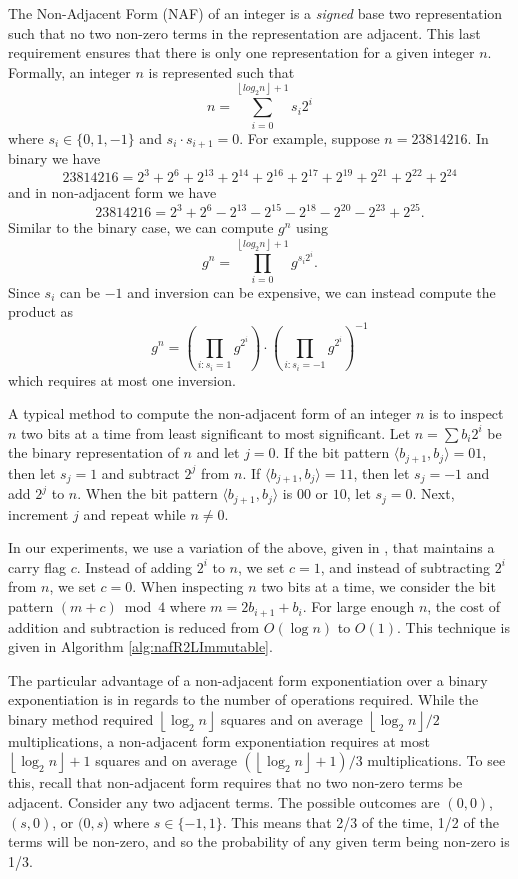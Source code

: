 \documentclass{ucalgthes1}
\theoremstyle{plain}
\theoremstyle{definition}
\newcommand{\floor}[1]{\left\lfloor #1 \right\rfloor}
\begin{document}
The Non-Adjacent Form (NAF) of an integer is a \emph{signed} base two representation such that no two non-zero terms in the representation are adjacent. This last requirement ensures that there is only one representation for a given integer $n$. Formally, an integer $n$ is represented such that
\[
	n = \sum_{i=0}^{\floor{log_2 n}+1} s_i 2^i
\]
where $s_i \in \{0, 1, -1\}$ and $s_i \cdot s_{i+1} = 0$. For example, suppose $n = 23814216$.  In binary we have
\begin{equation}\label{eq:binaryEg}
	23814216 = 2^3+2^6+2^{13}+2^{14}+2^{16}+2^{17}+2^{19}+2^{21}+2^{22}+2^{24}
\end{equation}
and in non-adjacent form we have
\begin{equation}\label{eq:nafEg}
	23814216 = 2^3+2^6-2^{13}-2^{15}-2^{18}-2^{20}-2^{23}+2^{25}.
\end{equation}
Similar to the binary case, we can compute $g^n$ using
\[
	g^n = \prod _{i=0}^{\floor{log_2 n}+1} g^{s_i 2^i}.
\]
Since $s_i$ can be $-1$ and inversion can be expensive, we can instead compute the product as
\[
	g^n = \left( \prod_{i : s_i=1} g^{2^i} \right) \cdot \left( \prod_{i : s_i=-1} g^{2^i} \right)^{-1}
\]
which requires at most one inversion.

A typical method to compute the non-adjacent form of an integer $n$ is to inspect $n$ two bits at a time from least significant to most significant.  Let $n=\sum b_i2^i$ be the binary representation of $n$ and let $j=0$.  If the bit pattern $\langle b_{j+1}, b_j \rangle = 01$, then let $s_j = 1$ and subtract $2^j$ from $n$.  If $\langle b_{j+1}, b_j \rangle = 11$, then let $s_j = -1$ and add $2^j$ to $n$.  When the bit pattern $\langle b_{j+1}, b_j \rangle$ is $00$ or $10$, let $s_j = 0$. Next, increment $j$ and repeat while $n \ne 0$.

In our experiments, we use a variation of the above, given in \cite[p.4]{Joye2000}, that maintains a carry flag $c$.  Instead of adding $2^i$ to $n$, we set $c = 1$, and instead of subtracting $2^i$ from $n$, we set $c = 0$.  When inspecting $n$ two bits at a time, we consider the bit pattern $(m+c) \bmod 4$ where $m = 2 b_{i+1} + b_i$.  For large enough $n$, the cost of addition and subtraction is reduced from $O(\log n)$ to $O(1)$.  This technique is given in Algorithm \ref{alg:nafR2LImmutable}.

The particular advantage of a non-adjacent form exponentiation over a binary exponentiation is in regards to the number of operations required.  While the binary method required $\floor{\log_2 n}$ squares and on average $\floor{\log_2 n}/2$ multiplications, a non-adjacent form exponentiation requires at most $\floor{\log_2 n}+1$ squares and on average $(\floor{\log_2 n}+1)/3$ multiplications.  To see this, recall that non-adjacent form requires that no two non-zero terms be adjacent.  Consider any two adjacent terms.  The possible outcomes are $(0,0)$, $(s, 0)$, or $(0, s$) where $s \in \{-1, 1\}$. This means that 2/3 of the time, 1/2 of the terms will be non-zero, and so the probability of any given term being non-zero is 1/3.
\end{document}
